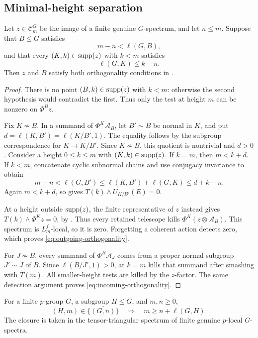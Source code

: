 \subsection{Minimal-height separation}

\begin{lemma}\label{lem:layer-orthogonality}
Let \(z\in\mathcal C_m^G\) be the image of a finite genuine
\(G\)-spectrum, and let \(n\le m\). Suppose that \(B\le G\) satisfies
\[
 m-n<\ell(G,B),
\]
and that every \((K,k)\in\operatorname{supp}(z)\) with \(k<m\) satisfies
\[
 \ell(G,K)\le k-n.
\]
Then \(z\) and \(B\) satisfy both orthogonality conditions in
.
\end{lemma}

\begin{proof}
There is no point \((B,k)\in\operatorname{supp}(z)\) with \(k<m\): otherwise the
second hypothesis would contradict the first. Thus only the test at height
\(m\) can be nonzero on \(\Phi^Bz\).

Fix \(K\not\sim B\). In a summand of \(\Phi^K\mathcal A_B\), let
\(B'\sim B\) be normal in \(K\), and put
\(d=\ell(K,B')=\ell(K/B',1)\). The equality follows by the subgroup
correspondence for \(K\to K/B'\). Since \(K\not\sim B\), this quotient
is nontrivial and \(d>0\). Consider a height
\(0\le k\le m\) with \((K,k)\in\operatorname{supp}(z)\). If \(k=m\), then
\(m<k+d\). If \(k<m\), concatenate cyclic subnormal chains and use
conjugacy invariance to obtain
\[
 m-n<\ell(G,B')
 \le\ell(K,B')+\ell(G,K)
 \le d+k-n.
\]
Again \(m<k+d\), so  gives
\(T(k)\wedge U_{K/B'}(E)=0\).

At a height outside \(\operatorname{supp}(z)\), the finite representative of \(z\)
instead gives \(T(k)\wedge\Phi^Kz=0\), by
. Thus every retained telescope kills
\(\Phi^K(z\otimes \mathcal A_B)\). This spectrum is \(L_m^f\)-local, so it is
zero. Forgetting a coherent action detects zero, which proves
\eqref{eq:outgoing-orthogonality}.

For \(J\not\sim B\), every summand of \(\Phi^B\mathcal A_J\) comes from a
proper normal subgroup \(J'\sim J\) of \(B\). Since
\(\ell(B/J',1)>0\),  at \(k=m\) kills that
summand after smashing with \(T(m)\). All smaller-height tests are killed
by the \(z\)-factor. The same detection argument proves
\eqref{eq:incoming-orthogonality}.
\end{proof}

\begin{theorem}\label{thm:specialization}
For a finite \(p\)-group \(G\), a subgroup \(H\le G\), and
\(m,n\ge0\),
\[
 (H,m)\in\overline{\{(G,n)\}}
 \quad\Longrightarrow\quad
 m\ge n+\ell(G,H).
\]
The closure is taken in the tensor-triangular spectrum of finite genuine
\(p\)-local \(G\)-spectra.
\end{theorem}


